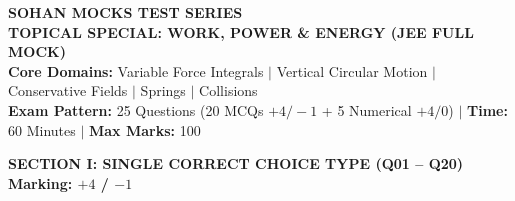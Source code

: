 \documentclass[11pt,a4paper]{article}
\begin{document}
\begin{tcolorbox}[dayheader]
\begin{center}
  {\Large \textbf{\textsf{\textcolor{goldAccent}{SOHAN MOCKS TEST SERIES}}}}\\[3pt]
  {\LARGE \textbf{\textsf{TOPICAL SPECIAL: WORK, POWER \& ENERGY (JEE FULL MOCK)}}}\\[5pt]
  {\normalsize \textbf{\textsf{Core Domains:}} Variable Force Integrals $\vert$ Vertical Circular Motion $\vert$ Conservative Fields $\vert$ Springs $\vert$ Collisions}\\[3pt]
  {\footnotesize \textbf{Exam Pattern:} 25 Questions (20 MCQs $+4/-1$ + 5 Numerical $+4/0$) \quad $\vert$ \quad \textbf{Time:} 60 Minutes \quad $\vert$ \quad \textbf{Max Marks:} 100}
\end{center}
\end{tcolorbox}

\vspace{6pt}

\begin{tcolorbox}[sectionbanner]
  {\large \textbf{\textsf{SECTION I: SINGLE CORRECT CHOICE TYPE (Q01 -- Q20)}}} \hfill {\small \textbf{Marking: $+4$ / $-1$}}
\end{tcolorbox}
\vspace{4pt}
\end{document}
